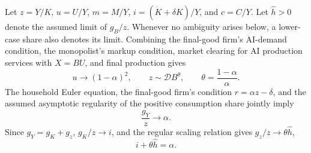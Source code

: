 Let \(z=Y/K\), \(u=U/Y\), \(m=M/Y\), \(i=(\dot K+\delta K)/Y\), and
\(c=C/Y\). Let \(\widehat h>0\) denote the assumed limit of \(g_B/z\).
Whenever no ambiguity arises below, a lower-case share also denotes its limit.
Combining the final-good firm's AI-demand condition, the monopolist's markup
condition, market clearing for AI production services with \(X=BU\), and final production gives
\[
 u\to(1-\alpha)^2,\qquad z\sim\mathcal D B^\theta,\qquad
 \theta=\frac{1-\alpha}{\alpha}.
\]
The household Euler equation, the final-good firm's condition
\(r=\alpha z-\delta\), and the assumed asymptotic regularity of the positive
consumption share jointly imply
\[
 \frac{g_Y}{z}\to\alpha.
\]
Since \(g_Y=g_K+g_z\), \(g_K/z\to i\), and the regular scaling relation gives
\(g_z/z\to\theta\widehat h\),
\begin{equation}
 i+\theta\widehat h=\alpha.
 \label{eq:axm-app-resource-growth}
\end{equation}

